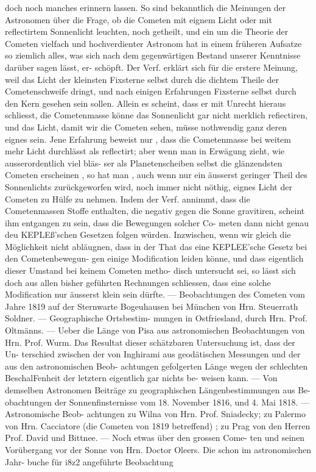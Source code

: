 \documentclass[12pt,a4paper]{article}
\begin{document}
{{{{{{{{doch  noch  manches  erinnern  lassen.  So  sind  bekanntlich  die  Meinungen  der  Astronomen  über  die  Frage, ob  die  Cometen  mit  eignem  Licht  oder  mit  reflectirtem  Sonnenlicht  leuchten,  noch  getheilt,  und  ein um  die  Theorie  der  Cometen  vielfach  und  hochverdienter  Astronom  hat  in  einem  früheren  Aufsatze  so ziemlich  alles,  was  sich  nach  dem  gegenwärtigen  Bestand  unserer  Kenntnisse  darüber  sagen  lässt,  er- schöpft. Der  Verf.  erklärt  sich  für  die  erstere  Meinung,  weil  das  Licht  der  kleinsten  Fixsterne  selbst durch  die  dichtem  Theile  der  Cometenschweife  dringt,  und  nach  einigen  Erfahrungen  Fixsterne  selbst  durch den  Kern  gesehen  sein  sollen.  Allein  es  scheint,  dass  er  mit  Unrecht  hieraus  schliesst,  die  Cometenmasse könne  das  Sonnenlicht  gar  nicht  merklich  refiectiren,  und  das  Licht,  damit  wir  die  Cometen  sehen,  müsse nothwendig  ganz  deren  eignes  sein.  Jene  Erfahrung  beweist  nur ,  dass  die  Cometenmasse  bei  weitem mehr  Licht  durchlässt  als  reflectirt;  aber  wenn  man  in  Erwägung  zieht,  wie  ausserordentlich  viel  bläs- ser als  Planetenscheiben  selbst  die  glänzendsten  Cometen  erscheinen ,  so  hat  man ,  auch  wenn  nur  ein äusserst  geringer  Theil  des  Sonnenlichts  zurückgeworfen  wird,  noch  immer  nicht  nöthig,  eignes  Licht der  Cometen  zu  Hülfe  zu  nehmen.  Indem  der  Verf.  annimmt,  dass  die  Cometenmassen  Stoffe  enthalten, die  negativ  gegen  die  Sonne  gravitiren,  scheint  ihm  entgangen  zu  sein,  dass  die  Bewegungen  solcher  Co- meten dann  nicht  genau  deu  KEPLEß'schen  Gesetzen  folgen  würden.  Inzwischen,  wenn  wir  gleich  die Möglichkeit  nicht  abläugnen,  dass  in  der  That  das  eine  KEPLEE'sche  Gesetz  bei  den  Cometenbewegun- gen  einige  Modification  leiden  könne,  und  dass  eigentlich  dieser  Umstand  bei  keinem  Cometen  metho- disch untersucht  sei,  so  lässt  sich  doch  aus  allen  bisher  geführten  Rechnungen  schliessen,  dass  eine solche  Modification  nur  äusserst  klein  sein  dürfte.  ---  Beobachtungen  des  Cometen  vom  Jahre  1819  auf der  Sternwarte  Bogeuhausen  bei  München  von  Hrn.  Steuerrath  Soldner.  ---  Geographische  Ortsbestim- mungen in  Ostfriesland,  durch  Hrn.  Prof.  Oltmänns.  ---  Ueber  die  Länge  von  Pisa  aus  astronomischen Beobachtungen  von  Hrn.  Prof.  Wurm.  Das  Resultat  dieser  schätzbaren  Untersuchung  ist,  dass  der  Un- terschied zwischen  der  von  Inghirami  aus  geodätischen  Messungen  und  der  aus  den  astronomischen  Beob- achtungen gefolgerten  Länge  wegen  der  schlechten  BeschalFenheit  der  letztern  eigentlich  gar  nichts  be- weisen kann.  ---  Von  demselben  Astronomen  Beiträge  zu  geographischen  Längenbestimmungen  aus  Be- obachtungen der  Sonnenfinsternisse  vom  18.  November  1816,  und  4.  Mai  1818.  ---  Astronomische  Beob- achtungen zu  Wilna  von  Hrn.  Prof.  Sniadecky;  zu  Palermo  von  Hrn.  Cacciatore  (die  Cometen  von  1819 betreffend) ;  zu  Prag  von  den  Herren  Prof.  David  und  Bittnee.  ---  Noch  etwas  über  den  grossen  Come- ten und  seinen  Vorübergang  vor  der  Sonne  von  Hrn.  Doctor  Oleers.  Die  schon  im  astronomischen  Jahr- buche für  i8z2  angeführte  Beobachtung  }}}}}}}}
\end{document}
